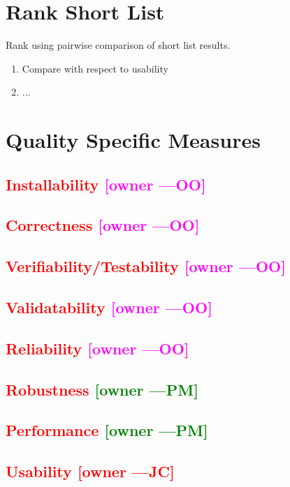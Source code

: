 \documentclass[letterpaper,cleveref]{lipics-v2019}
\newcommand{\authornote}[3]{\textcolor{#1}{[#3 ---#2]}}
\newcommand{\authornote}[3]{}
\newcommand{\jc}[1]{\authornote{red}{JC}{#1}} %
\newcommand{\oo}[1]{\authornote{magenta}{OO}{#1}} %
\newcommand{\pmi}[1]{\authornote{green}{PM}{#1}} %
\newcommand{\notdone}[1]{\textcolor{red}{#1}}
\theoremstyle{definition}
\begin{document}
\section{Rank Short List} \label{SecRankShortList}
Rank using pairwise comparison of short list results.
\begin{enumerate}
	\item Compare with respect to usability
	\item ...
\end{enumerate}

\section{Quality Specific Measures}

\subsection{\notdone{Installability} \oo{owner}}

\subsection{\notdone{Correctness} \oo{owner}}

\subsection{\notdone{Verifiability/Testability} \oo{owner}}

\subsection{\notdone{Validatability} \oo{owner}}

\subsection{\notdone{Reliability} \oo{owner}}

\subsection{\notdone{Robustness} \pmi{owner}}

\subsection{\notdone{Performance} \pmi{owner}}

\subsection{\notdone{Usability} \jc{owner}} 
\end{document}
